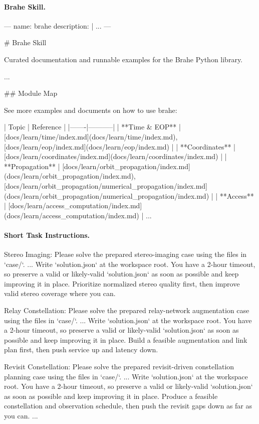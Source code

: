 \documentclass[]{mosi}
\newenvironment{promptblockcompact}
  {\VerbatimEnvironment\par\smallskip\Needspace{6\baselineskip}\noindent\begin{promptblockinnercompact}}
  {\end{promptblockinnercompact}\par\smallskip}
\newcommand{\promptheadingcompact}[1]{\Needspace{4\baselineskip}\paragraph{#1}\mbox{}\par}
\begin{document}
\promptheadingcompact{Brahe Skill.}
\begin{promptblockcompact}
---
name: brahe
description: |
  ...
---

# Brahe Skill

Curated documentation and runnable examples for the Brahe Python library.

...

## Module Map

See more examples and documents on how to use brahe:

| Topic | Reference |
|-------|-----------|
| **Time & EOP** | [docs/learn/time/index.md](docs/learn/time/index.md),
  [docs/learn/eop/index.md](docs/learn/eop/index.md) |
| **Coordinates** | [docs/learn/coordinates/index.md](docs/learn/coordinates/index.md) |
| **Propagation** | [docs/learn/orbit_propagation/index.md](docs/learn/orbit_propagation/index.md),
  [docs/learn/orbit_propagation/numerical_propagation/index.md](docs/learn/orbit_propagation/numerical_propagation/index.md) |
| **Access** | [docs/learn/access_computation/index.md](docs/learn/access_computation/index.md) |
...
\end{promptblockcompact}

\promptheadingcompact{Short Task Instructions.}
\begin{promptblockcompact}
Stereo Imaging:
Please solve the prepared stereo-imaging case using the files in `case/`.
...
Write `solution.json` at the workspace root. You have a 2-hour timeout, so
preserve a valid or likely-valid `solution.json` as soon as possible and keep
improving it in place. Prioritize normalized stereo quality first, then
improve valid stereo coverage where you can.

Relay Constellation:
Please solve the prepared relay-network augmentation case using the files in
`case/`.
...
Write `solution.json` at the workspace root. You have a 2-hour timeout, so
preserve a valid or likely-valid `solution.json` as soon as possible and keep
improving it in place. Build a feasible augmentation and link plan first, then
push service up and latency down.

Revisit Constellation:
Please solve the prepared revisit-driven constellation planning case using the
files in `case/`.
...
Write `solution.json` at the workspace root. You have a 2-hour timeout, so
preserve a valid or likely-valid `solution.json` as soon as possible and keep
improving it in place. Produce a feasible constellation and observation
schedule, then push the revisit gaps down as far as you can.
...
\end{promptblockcompact}
\end{document}
